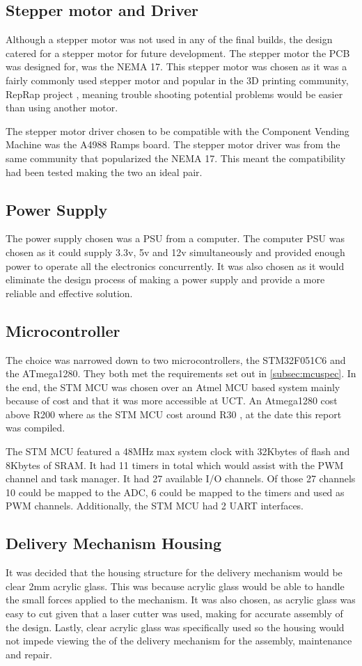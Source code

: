 \documentclass[a4paper,11pt]{article}
\newcommand*{\halfref}[1]{\hyperref[{#1}]{\autoref*{#1}}}
\numberwithin{figure}{section}
\numberwithin{table}{section}
\begin{document}
\subsection{Stepper motor and Driver}
Although a stepper motor was not used in any of the final builds, the design catered for a stepper motor for future development. The stepper motor the PCB was designed for, was the NEMA 17. This stepper motor was chosen as it was a fairly commonly used stepper motor and popular in the 3D printing community, RepRap project \cite{reprap}, meaning trouble shooting potential problems would be easier than using another motor.

The stepper motor driver chosen to be compatible with the Component Vending Machine was the A4988 Ramps board. The stepper motor driver was from the same community that popularized the NEMA 17. This meant the compatibility had been tested making the two an ideal pair.

\subsection{Power Supply}
The power supply chosen was a PSU from a computer. The computer PSU was chosen as it could supply 3.3v, 5v and 12v simultaneously and provided enough power to operate all the electronics concurrently. It was also chosen as it would eliminate the design process of making a power supply and provide a more reliable and effective solution.

\subsection{Microcontroller}
The choice was narrowed down to two microcontrollers, the STM32F051C6 and the ATmega1280. They both met the requirements set out in \halfref{subsec:mcuspec}. In the end, the STM MCU was chosen over an Atmel MCU based system mainly because of cost and that it was more accessible at UCT. An Atmega1280 cost above R200 where as the STM MCU cost around R30 \cite{rsonline}, at the date this report was compiled. 

The STM MCU featured a 48MHz max system clock with 32Kbytes of flash and 8Kbytes of SRAM. It had 11 timers in total which would assist with the PWM channel and task manager. It had 27 available I/O channels. Of those 27 channels 10 could be mapped to the ADC, 6 could be mapped to the timers and used as PWM channels. Additionally, the STM MCU had 2 UART interfaces.

\subsection{Delivery Mechanism Housing}
It was decided that the housing structure for the delivery mechanism would be clear 2mm acrylic glass. This was because acrylic glass would be able to handle the small forces applied to the mechanism. It was also chosen, as acrylic glass was easy to cut given that a laser cutter was used, making for accurate assembly of the design. Lastly, clear acrylic glass was specifically used so the housing would not impede viewing the of the delivery mechanism for the assembly, maintenance and repair. 
\end{document}
